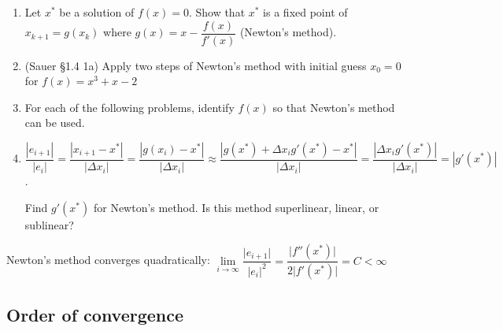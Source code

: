 \documentclass[12pt,letterpaper,noanswers]{exam}
\begin{document}
\begin{enumerate}
\item Let $x^*$ be a solution of $f(x) = 0$.  Show that $x^*$ is a fixed point of $x_{k+1} = g(x_k)$ where $g(x) = x - \dfrac{f(x)}{f'(x)}$ (Newton's method).
\vspace{1in}
    \item (Sauer \S1.4 1a) Apply two steps of Newton's method with initial guess $x_0 = 0$ for $f(x) = x^3+x-2$
    \vspace{1in}

        \item For each of the following problems, identify $f(x)$ so that Newton's method can be used.
\vspace{1in}

\item $\dfrac{\left\vert e_{i+1} \right\vert}{\left\vert e_{i} \right\vert} = \dfrac{\left\vert x_{i+1}-x^*\right\vert}{\left\vert \Delta x_i \right\vert} = \dfrac{\left\vert g(x_{i}) -x^*\right\vert}{\left\vert \Delta x_i \right\vert} \approx \dfrac{\left\vert g(x^*) + \Delta x_i g'(x^*) -x^*\right\vert}{\left\vert \Delta x_i \right\vert} = \dfrac{\left\vert  \Delta x_i g'(x^*) \right\vert}{\left\vert \Delta x_i \right\vert} = \left\vert g'(x^*) \right\vert$.

    Find $g'(x^*)$ for Newton's method.  Is this method superlinear, linear, or sublinear?
    \end{enumerate}
    \vspace{1in}

        Newton's method converges quadratically: $\lim\limits_{i\rightarrow\infty} \dfrac{\vert e_{i+1}\vert }{\vert e_i\vert^2 } = \dfrac{\vert f''(x^*)\vert}{2\vert f'(x^*)\vert} = C < \infty$
 
\subsection*{Order of convergence}
\end{document}
